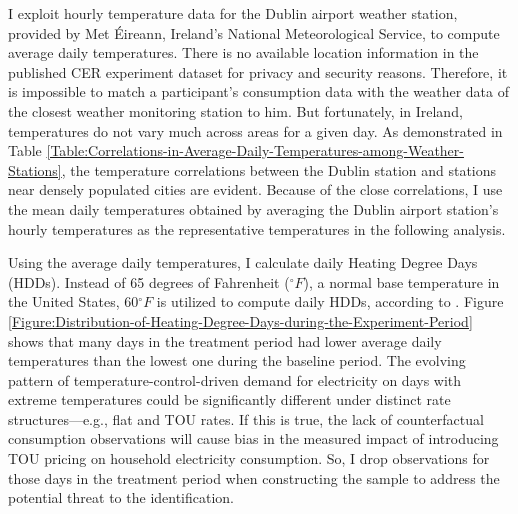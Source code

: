 I exploit hourly temperature data for the Dublin airport weather station, provided by Met \'{E}ireann, Ireland's National Meteorological Service, to compute average daily temperatures. There is no available location information in the published CER experiment dataset for privacy and security reasons. Therefore, it is impossible to match a participant's consumption data with the weather data of the closest weather monitoring station to him. But fortunately, in Ireland, temperatures do not vary much across areas for a given day. As demonstrated in Table \ref{Table:Correlations-in-Average-Daily-Temperatures-among-Weather-Stations}, the temperature correlations between the Dublin station and stations near densely populated cities are evident. Because of the close correlations, I use the mean daily temperatures obtained by averaging the Dublin airport station's hourly temperatures as the representative temperatures in the following analysis. 

Using the average daily temperatures, I calculate daily Heating Degree Days (HDDs). Instead of 65 degrees of Fahrenheit ($^{\circ}F$), a normal base temperature in the United States, 60$^{\circ}F$ is utilized to compute daily HDDs, according to \cite{The-Impacts-of-Climate-Change-on-Domestic-Natural-Gas-Consumption-in-the-Greater-Dublin-Region_Liu-and-Sweeney_2012}. Figure \ref{Figure:Distribution-of-Heating-Degree-Days-during-the-Experiment-Period} shows that many days in the treatment period had lower average daily temperatures than the lowest one during the baseline period. The evolving pattern of temperature-control-driven demand for electricity on days with extreme temperatures could be significantly different under distinct rate structures---e.g., flat and TOU rates. If this is true, the lack of counterfactual consumption observations will cause bias in the measured impact of introducing TOU pricing on household electricity consumption. So, I drop observations for those days in the treatment period when constructing the sample to address the potential threat to the identification. 

